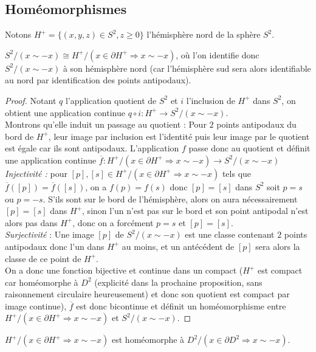 \subsection{Homéomorphismes}
Notons $H^+=\{(x,y,z)\in S^2, z\geq0\}$ l'hémisphère nord de la sphère $S^2$.
\begin{proposition}
    $S^2/(x\sim-x)\cong H^+/(x\in\partial H^+\Rightarrow x\sim-x)$, où l'on identifie donc $S^2/(x\sim -x)$ à son hémisphère nord (car l'hémisphère sud sera alors identifiable au nord par identification des points antipodaux).
\end{proposition}
\begin{proof}
    Notant $q$ l'application quotient de $S^2$ et $i$ l'inclusion de $H^+$ dans $S^2$, on obtient une application continue $q\circ i:H^+\rightarrow S^2/(x\sim -x)$.\medskip\\
    Montrons qu'elle induit un passage au quotient : Pour $2$ points antipodaux du bord de $H^+$, leur image par inclusion est l'identité puis leur image par le quotient est égale car ils sont antipodaux. L'application $f$ passe donc au quotient et définit une application continue $\overline{f}:H^+/(x\in\partial H^+\Rightarrow x\sim-x)\rightarrow S^2/(x\sim-x)$\medskip\\
    \textit{Injectivité :} pour $[p],[s]\in H^+/(x\in\partial H^+\Rightarrow x\sim-x)$ tels que $\overline{f}([p])=\overline{f}([s])$, on a $f(p)=f(s)$ donc $[p]=[s]$ dans $S^2$ soit $p=s$ ou $p=-s$. S'ils sont sur le bord de l'hémisphère, alors on aura nécessairement $[p]=[s]$ dans $H^+$, sinon l'un n'est pas sur le bord et son point antipodal n'est alors pas dans $H^+$, donc on a forcément $p=s$ et $[p]=[s]$.\medskip\\
    \textit{Surjectivité} : Une image $[p]$ de $S^2/(x\sim-x)$ est une classe contenant $2$ points antipodaux donc l'un dans $H^+$ au moins, et un antécédent de $[p]$ sera alors la classe de ce point de $H^+$.\medskip\\
    On a donc une fonction bijective et continue dans un compact ($H^+$ est compact car homéomorphe à $D^2$ (explicité dans la prochaine proposition, sans raisonnement circulaire heureusement) et donc son quotient est compact par image continue), $\overline{f}$ est donc bicontinue et définit un homéomorphisme entre $H^+/(x\in\partial H^+\Rightarrow x\sim-x)$ et $S^2/(x\sim-x)$.
\end{proof}
\begin{proposition}
    $H^+/(x\in\partial H^+\Rightarrow x\sim-x)$ est homéomorphe à $D^2/(x\in\partial D^2\Rightarrow x\sim-x)$.
\end{proposition}
